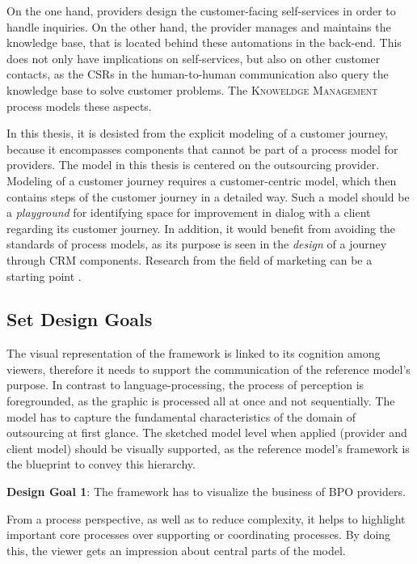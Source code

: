	On the one hand, providers design the customer-facing self-services in order to handle inquiries. On the other hand, the provider manages and maintains the knowledge base, that is located behind these automations in the back-end. This does not only have implications on self-services, but also on other customer contacts, as the \acrshort{CSR}s in the human-to-human communication also query the knowledge base to solve customer problems. The \textsc{Knoweldge Management} process models these aspects.
	
	In this thesis, it is desisted from the explicit modeling of a customer journey, because it encompasses components that cannot be part of a process model for providers. The model in this thesis is centered on the outsourcing provider. Modeling of a customer journey requires a customer-centric model, which then contains steps of the customer journey in a detailed way. Such a model should be a \textit{playground} for identifying space for improvement in dialog with a client regarding its customer journey. In addition, it would benefit from avoiding the standards of process models, as its purpose is seen in the \textit{design} of a journey through \acrshort{CRM} components. Research from the field of marketing can be a starting point \citep{Lemon_2016, Frow_2007}. 
	
	\subsection{Set Design Goals}
	\label{sec:frdg}
	The visual representation of the framework is linked to its cognition among viewers, therefore it needs to support the communication of the reference model's purpose. In contrast to language-processing, the process of perception is foregrounded, as the graphic is processed all at once and not sequentially. The model has to capture the fundamental characteristics of the domain of outsourcing at first glance. The sketched model level when applied (provider and client model) should be visually supported, as the reference model's framework is the blueprint to convey this hierarchy. 
	
	\hfill\begin{minipage}{\dimexpr\textwidth-1.2cm}
		\textbf{Design Goal 1}: The framework has to visualize the business of BPO providers.
	\end{minipage}

From a process perspective, as well as to reduce complexity, it helps to highlight important core processes over supporting or coordinating processes. By doing this, the viewer gets an impression about central parts of the model. 

